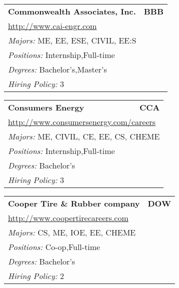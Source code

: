 \documentclass[twoside]{article}
\begin{document}
\begin{center}
\begin{multicols}{3}
\begin{FlushLeft}
\begin{minipage}{\columnwidth}
\end{minipage}
 
\begin{minipage}{\columnwidth}\begin{tabularx}{.95\columnwidth}{Xr}
                 {\Large\bf Commonwealth Associates, Inc.} & {\Large\bf BBB}\\
    \multicolumn{2}{p{.95\columnwidth}}{\url{http://www.cai-engr.com}}\\
    \multicolumn{2}{p{.95\columnwidth}}{\emph{Majors:} ME, EE, ESE, CIVIL, EE:S}\\
    \multicolumn{2}{p{.95\columnwidth}}{\emph{Positions:} Internship,Full-time}\\
    \multicolumn{2}{p{.95\columnwidth}}{\emph{Degrees:} Bachelor's,Master's}\\
    \multicolumn{2}{p{.95\columnwidth}}{\emph{Hiring Policy:} 3}\\
    \end{tabularx}
    
\end{minipage}
 
\begin{minipage}{\columnwidth}\begin{tabularx}{.95\columnwidth}{Xr}
                 {\Large\bf Consumers Energy} & {\Large\bf CCA}\\
    \multicolumn{2}{p{.95\columnwidth}}{\url{http://www.consumersenergy.com/careers}}\\
    \multicolumn{2}{p{.95\columnwidth}}{\emph{Majors:} ME, CIVIL, CE, EE, CS, CHEME}\\
    \multicolumn{2}{p{.95\columnwidth}}{\emph{Positions:} Internship,Full-time}\\
    \multicolumn{2}{p{.95\columnwidth}}{\emph{Degrees:} Bachelor's}\\
    \multicolumn{2}{p{.95\columnwidth}}{\emph{Hiring Policy:} 3}\\
    \end{tabularx}
    
\end{minipage}
 
\begin{minipage}{\columnwidth}\begin{tabularx}{.95\columnwidth}{Xr}
                 {\Large\bf Cooper Tire \& Rubber company} & {\Large\bf DOW}\\
    \multicolumn{2}{p{.95\columnwidth}}{\url{http://www.coopertirecareers.com}}\\
    \multicolumn{2}{p{.95\columnwidth}}{\emph{Majors:} CS, ME, IOE, EE, CHEME}\\
    \multicolumn{2}{p{.95\columnwidth}}{\emph{Positions:} Co-op,Full-time}\\
    \multicolumn{2}{p{.95\columnwidth}}{\emph{Degrees:} Bachelor's}\\
    \multicolumn{2}{p{.95\columnwidth}}{\emph{Hiring Policy:} 2}\\
    \end{tabularx}
    

\end{minipage}
\end{FlushLeft}
\end{multicols}
\end{center}
\end{document}
